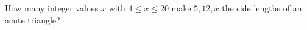 How many integer values $x$ with $4\le x\le20$ make $5,12,x$ the side lengths of an acute triangle?
